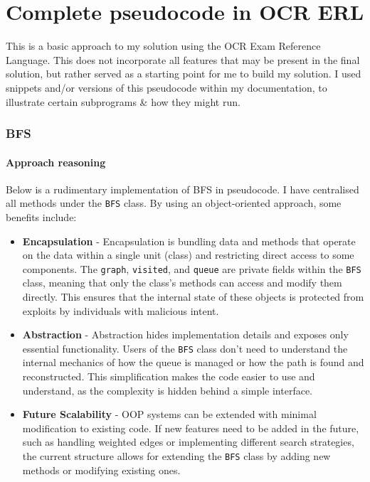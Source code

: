 \chapter{Complete pseudocode in OCR ERL}

This is a basic approach to my solution using the OCR Exam Reference Language. This does not incorporate all features that may be present in the final solution, but rather served as a starting point for me to build my solution. I used snippets and/or versions of this pseudocode within my documentation, to illustrate certain subprograms \& how they might run.

\subsection{BFS}

\subsubsection{Approach reasoning}

Below is a rudimentary implementation of BFS in pseudocode. I have centralised all methods under the \verb|BFS| class. By using an object-oriented approach, some benefits include:

\begin{itemize}

    \item \textbf{Encapsulation} -  Encapsulation is bundling data and methods that operate on the data within a single unit (class) and restricting direct access to some components. The \verb|graph|, \verb|visited|, and \verb|queue| are private fields within the \verb|BFS| class, meaning that only the class’s methods can access and modify them directly. This ensures that the internal state of these objects is protected from exploits by individuals with malicious intent.

    \item \textbf{Abstraction} - Abstraction hides implementation details and exposes only essential functionality. Users of the \verb|BFS| class don’t need to understand the internal mechanics of how the queue is managed or how the path is found and reconstructed. This simplification makes the code easier to use and understand, as the complexity is hidden behind a simple interface.
    
    \item \textbf{Future Scalability} - OOP systems can be extended with minimal modification to existing code. If new features need to be added in the future, such as handling weighted edges or implementing different search strategies, the current structure allows for extending the \verb|BFS| class by adding new methods or modifying existing ones.
    
\end{itemize}

